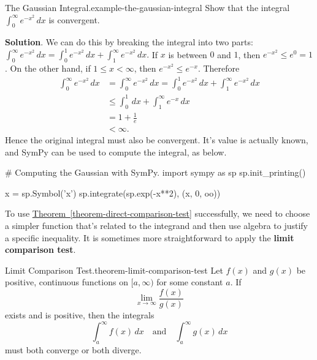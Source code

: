 \documentclass[10pt,]{book}
\newcommand{\terminology}[1]{\textbf{#1}}
\numberwithin{equation}{section}
\newcommand{\lt}{<}
\begin{document}
\begin{example}{The Gaussian Integral.}{example-the-gaussian-integral}%
\hypertarget{p-606}{}%
Show that the integral \(\int_{0}^{\infty}e^{-x^{2}}\,dx\) is convergent.%
\par\smallskip%
\noindent\textbf{Solution}.\hypertarget{solution-132}{}\quad%
\hypertarget{p-607}{}%
We can do this by breaking the integral into two parts: \(\int_{0}^{\infty}e^{-x^{2}}\,dx = \int_{0}^{1}e^{-x^{2}}\,dx + \int_{1}^{\infty}e^{-x^{2}}\,dx.\) If \(x\) is between \(0\) and \(1\), then \(e^{-x^{2}} \leq e^{0} = 1\). On the other hand, if \(1\leq x\lt \infty\), then \(e^{-x^{2}} \leq e^{-x}\). Therefore%
\begin{align*}
\int_{0}^{\infty}e^{-x^{2}}\,dx & = \int_{0}^{\infty}e^{-x^{2}}\,dx = \int_{0}^{1}e^{-x^{2}}\,dx + \int_{1}^{\infty}e^{-x^{2}}\,dx\\
& \leq \int_{0}^{1}\,dx + \int_{1}^{\infty}e^{-x}\,dx \\
& = 1 + \frac{1}{e} \\
& \lt \infty.
\end{align*}
Hence the original integral must also be convergent. It's value is actually known, and SymPy can be used to compute the integral, as below.%
\end{example}
\begin{sageinput}
# Computing the Gaussian with SymPy.
import sympy as sp
sp.init_printing()

x = sp.Symbol('x')
sp.integrate(sp.exp(-x**2), (x, 0, oo))
\end{sageinput}
\hypertarget{p-608}{}%
To use \hyperref[theorem-direct-comparison-test]{Theorem~\ref{theorem-direct-comparison-test}} successfully, we need to choose a simpler function that's related to the integrand and then use algebra to justify a specific inequality. It is sometimes more straightforward to apply the \terminology{limit comparison test}.%
\begin{theorem}{Limit Comparison Test.}{}{theorem-limit-comparison-test}%
\hypertarget{p-609}{}%
Let \(f(x)\) and \(g(x)\) be positive, continuous functions on \([a,\infty)\) for some constant \(a\). If%
\begin{equation*}
\lim_{x\to\infty}\frac{f(x)}{g(x)}
\end{equation*}
exists and is positive, then the integrals%
\begin{equation*}
\int_{a}^{\infty}f(x)\,dx\quad\text{and}\quad\int_{a}^{\infty}g(x)\,dx
\end{equation*}
must both converge or both diverge.%
\end{theorem}
\end{document}
